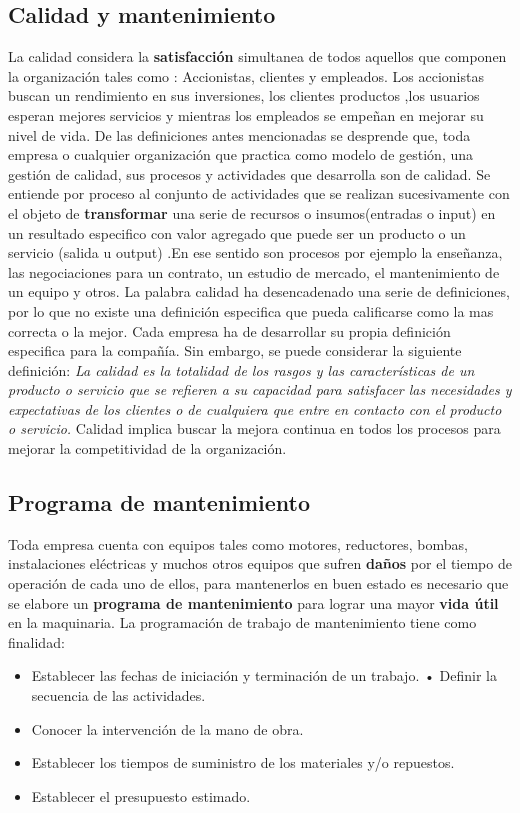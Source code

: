 \documentclass[
	12pt, %
	fleqn, %
	a4paper, %
	oneside, %
]{LegrandOrangeBook}
\begin{document}
\subsection{Calidad y mantenimiento}
La calidad considera la \textbf{satisfacción} simultanea de todos aquellos que componen la organización tales como : Accionistas, clientes y empleados. Los accionistas buscan un rendimiento en sus inversiones, los clientes productos ,los usuarios esperan mejores servicios y mientras los empleados se empeñan en mejorar su nivel de vida. De las definiciones antes mencionadas se desprende que, toda empresa o cualquier organización que practica como modelo de gestión, una gestión de calidad, sus procesos y actividades que desarrolla son de calidad. Se entiende por proceso al conjunto de actividades que se realizan sucesivamente con el objeto de \textbf{transformar} una serie de recursos o insumos(entradas o input) en un resultado especifico con valor agregado que puede ser un producto o un servicio (salida u output) .En ese sentido son procesos por ejemplo la enseñanza, las negociaciones para un contrato, un estudio de mercado, el mantenimiento de un equipo y otros. La palabra calidad ha desencadenado una serie de definiciones, por lo que no existe una definición especifica que pueda calificarse como la mas correcta o la mejor. Cada empresa ha de desarrollar su propia definición especifica para la compañía. Sin embargo, se puede considerar la siguiente definición: \emph{La calidad es la totalidad de los rasgos y las características de un producto o servicio que se refieren a su capacidad para satisfacer las necesidades y expectativas de los clientes o de cualquiera que entre en contacto con el producto o servicio.} Calidad implica buscar la mejora continua en todos los procesos para mejorar la competitividad de la organización.
\subsection{Programa de mantenimiento}
Toda empresa cuenta con equipos tales como motores, reductores, bombas, instalaciones eléctricas y muchos otros equipos que sufren \textbf{daños} por el tiempo de operación de cada uno de ellos, para mantenerlos en buen estado es necesario que se elabore un \textbf{programa de mantenimiento} para lograr una mayor \textbf{vida útil} en la maquinaria. La programación de trabajo de mantenimiento tiene como finalidad:
\begin{itemize}
\item Establecer las fechas de iniciación y terminación de un trabajo. • Definir la secuencia de las actividades.
\item Conocer la intervención de la mano de obra.
\item Establecer los tiempos de suministro de los materiales y/o repuestos.
\item Establecer el presupuesto estimado.
\end{itemize}
\end{document}
